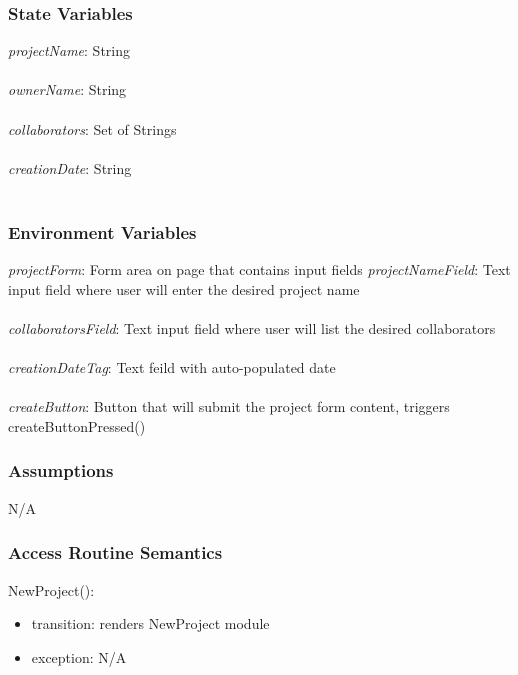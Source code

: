 \documentclass[12pt, titlepage]{article}
\begin{document}
	\subsubsection{State Variables}
	\textit{projectName}: String \\\\ 
	\textit{ownerName}: String \\\\ 
	\textit{collaborators}: Set of Strings \\\\
	\textit{creationDate}: String \\\\
	
	\subsubsection{Environment Variables}
	\textit{projectForm}: Form area on page that contains input fields
	\textit{projectNameField}: Text input field where user will enter the desired project name \\\\ 
	\textit{collaboratorsField}: Text input field where user will list the desired collaborators\\\\
	\textit{creationDateTag}: Text feild with auto-populated date \\\\
	\textit{createButton}: Button that will submit the project form content, triggers createButtonPressed()
	
	\subsubsection{Assumptions}
	N/A
	
	\subsubsection{Access Routine Semantics}
	
	\noindent NewProject():
	\begin{itemize}
		\item transition: renders NewProject module
		\item exception: N/A
	\end{itemize}
	
\end{document}
